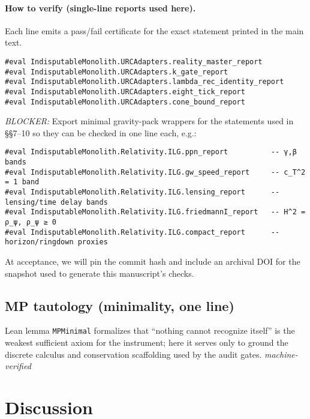 \documentclass[12pt,a4paper]{article}
\begin{document}
\paragraph{How to verify (single-line reports used here).}
Each line emits a pass/fail certificate for the exact statement printed in the main text.
\begin{verbatim}
#eval IndisputableMonolith.URCAdapters.reality_master_report
#eval IndisputableMonolith.URCAdapters.k_gate_report
#eval IndisputableMonolith.URCAdapters.lambda_rec_identity_report
#eval IndisputableMonolith.URCAdapters.eight_tick_report
#eval IndisputableMonolith.URCAdapters.cone_bound_report
\end{verbatim}
\emph{BLOCKER:} Export minimal gravity-pack wrappers for the statements used in §§7–10 so they can be checked in one line each, e.g.:
\begin{verbatim}
#eval IndisputableMonolith.Relativity.ILG.ppn_report          -- γ,β bands
#eval IndisputableMonolith.Relativity.ILG.gw_speed_report     -- c_T^2 = 1 band
#eval IndisputableMonolith.Relativity.ILG.lensing_report      -- lensing/time delay bands
#eval IndisputableMonolith.Relativity.ILG.friedmannI_report   -- H^2 = ρ_ψ, ρ_ψ ≥ 0
#eval IndisputableMonolith.Relativity.ILG.compact_report      -- horizon/ringdown proxies
\end{verbatim}
At acceptance, we will pin the commit hash and include an archival DOI for the snapshot used to generate this manuscript’s checks.

\subsection{MP tautology (minimality, one line)}
Lean lemma \texttt{MPMinimal} formalizes that “nothing cannot recognize itself” is the weakest sufficient axiom for the instrument; here it serves only to ground the discrete calculus and conservation scaffolding used by the audit gates. \emph{machine-verified}

\section{Discussion}
\end{document}
